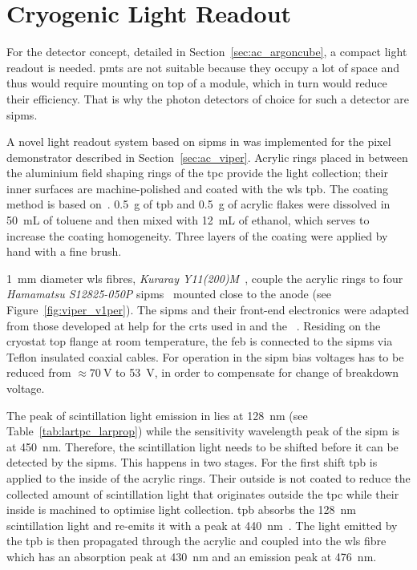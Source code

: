 \section{Cryogenic  Light Readout}
\label{sec:studies_viper-light-ro}


For the \AC{} detector concept, detailed in Section~\ref{sec:ac_argoncube}, a compact light readout is needed.
\glspl{pmt} are not suitable because they occupy a lot of space and thus would require mounting on top of a module, which in turn would reduce their efficiency.
That is why the photon detectors of choice for such a detector are \glspl{sipm}.

A novel light readout system based on \glspl{sipm} in \lar{} was implemented for the \AC{} pixel demonstrator described in Section~\ref{sec:ac_viper}.
Acrylic rings placed in between the aluminium field shaping rings of the \gls{tpc} provide the light collection; their inner surfaces are machine-polished and coated with the \gls{wls} \gls{tpb}. 
The coating method is based on~\cite{TPBcoating}.
\SI{0.5}{\gram} of \gls{tpb} and \SI{0.5}{\gram} of acrylic flakes were dissolved in \SI{50}{\milli\liter} of toluene and then mixed with \SI{12}{\milli\liter} of ethanol, which serves to increase the coating homogeneity. 
Three layers of the coating were applied by hand with a fine brush. 

\SI{1}{\milli\metre} diameter \gls{wls} fibres, \emph{Kuraray Y11(200)M}~\cite{kuraray}, couple the acrylic rings to four \emph{Hamamatsu S12825-050P} \glspl{sipm}~\cite{crt_sipm} mounted close to the anode (see Figure~\ref{fig:viper_v1per}). 
The \glspl{sipm} and their front-end electronics were adapted from those developed at \gls{help} for the \glspl{crt} used in \uboone{} and the \sbnd{}~\cite{crt, crt_feb}.
Residing on the cryostat top flange at room temperature, the \gls{feb} is connected to the \glspl{sipm} via Teflon insulated coaxial cables.
For operation in \lar{} the \gls{sipm} bias voltages has to be reduced from $\approx \SI{70}{\volt}$ to \SI{53}{\volt}, in order to compensate for change of breakdown voltage.

The peak of scintillation light emission in \lar{} lies at \SI{128}{\nano\metre} (see Table~\ref{tab:lartpc_larprop}) while the sensitivity wavelength peak of the \gls{sipm} is at \SI{450}{\nano\metre}.
Therefore, the scintillation light needs to be shifted before it can be detected by the \glspl{sipm}.
This happens in two stages.
For the first shift \gls{tpb} is applied to the inside of the acrylic rings.
Their outside is not coated to reduce the collected amount of scintillation light that originates outside the \gls{tpc} while their inside is machined to optimise light collection.
\gls{tpb} absorbs the \SI{128}{\nano\metre} scintillation light and re-emits it with a peak at \SI{440}{\nano\metre}~\cite{tpb}.
The light emitted by the \gls{tpb} is then propagated through the acrylic and coupled into the \gls{wls} fibre which has an absorption peak at \SI{430}{\nano\metre} and an emission peak at \SI{476}{\nano\metre}.

